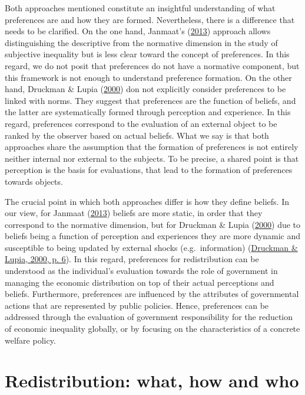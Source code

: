 \documentclass[
  12pt,
]{book}
\begin{document}
Both approaches mentioned constitute an insightful understanding of what preferences are and how they are formed. Nevertheless, there is a difference that needs to be clarified. On the one hand, Janmaat's (\protect\hyperlink{ref-Janmaat2013}{2013}) approach allows distinguishing the descriptive from the normative dimension in the study of subjective inequality but is less clear toward the concept of preferences. In this regard, we do not posit that preferences do not have a normative component, but this framework is not enough to understand preference formation. On the other hand, Druckman \& Lupia (\protect\hyperlink{ref-druckman_preference_2000}{2000}) don not explicitly consider preferences to be linked with norms. They suggest that preferences are the function of beliefs, and the latter are systematically formed through perception and experience. In this regard, preferences correspond to the evaluation of an external object to be ranked by the observer based on actual beliefs. What we say is that both approaches share the assumption that the formation of preferences is not entirely neither internal nor external to the subjects. To be precise, a shared point is that perception is the basis for evaluations, that lead to the formation of preferences towards objects.

The crucial point in which both approaches differ is how they define beliefs. In our view, for Janmaat (\protect\hyperlink{ref-Janmaat2013}{2013}) beliefs are more static, in order that they correspond to the normative dimension, but for Druckman \& Lupia (\protect\hyperlink{ref-druckman_preference_2000}{2000}) due to beliefs being a function of perception and experiences they are more dynamic and susceptible to being updated by external shocks (e.g.~information) (\protect\hyperlink{ref-druckman_preference_2000}{Druckman \& Lupia, 2000, p. 6}). In this regard, preferences for redistribution can be understood as the individual's evaluation towards the role of government in managing the economic distribution on top of their actual perceptions and beliefs. Furthermore, preferences are influenced by the attributes of governmental actions that are represented by public policies. Hence, preferences can be addressed through the evaluation of government responsibility for the reduction of economic inequality globally, or by focusing on the characteristics of a concrete welfare policy.

\hypertarget{redistribution-what-how-and-who}{%
\section{Redistribution: what, how and who}\label{redistribution-what-how-and-who}}
\end{document}
